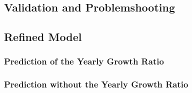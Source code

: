\documentclass[
  twocolumn]{article}
\begin{document}
\hypertarget{validation-and-problemshooting-1}{%
\subsection{Validation and
Problemshooting}\label{validation-and-problemshooting-1}}

\hypertarget{refined-model-2}{%
\subsection{Refined Model}\label{refined-model-2}}

\hypertarget{prediction-of-the-yearly-growth-ratio-1}{%
\subsubsection{Prediction of the Yearly Growth
Ratio}\label{prediction-of-the-yearly-growth-ratio-1}}

\hypertarget{prediction-without-the-yearly-growth-ratio-1}{%
\subsubsection{Prediction without the Yearly Growth
Ratio}\label{prediction-without-the-yearly-growth-ratio-1}}
\end{document}
